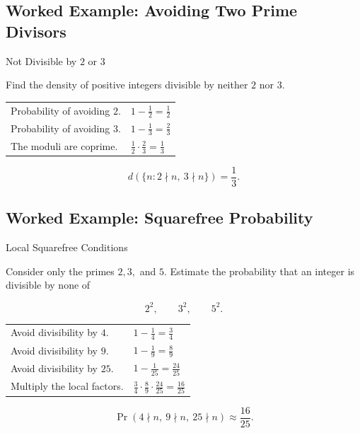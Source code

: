 \subsection{Worked Example: Avoiding Two Prime Divisors}
\label{subsec:worked-avoiding-primes}

\begin{workedexamplebox}{Not Divisible by \(2\) or \(3\)}

Find the density of positive integers divisible by neither \(2\) nor \(3\).

\begin{tabularx}{\textwidth}{@{}>{\raggedright\arraybackslash}p{}X@{}}
Probability of avoiding \(2\). & \(1-\frac12=\frac12\)\\
Probability of avoiding \(3\). & \(1-\frac13=\frac23\)\\
The moduli are coprime. & \(\frac12\cdot\frac23=\frac13\)
\end{tabularx}

\begin{answerbox}
\[ \boxed{d(\{n:2\nmid n,\ 3\nmid n\})=\frac13.} \]
\end{answerbox}
\end{workedexamplebox}

\subsection{Worked Example: Squarefree Probability}
\label{subsec:worked-squarefree-probability}

\begin{workedexamplebox}{Local Squarefree Conditions}

Consider only the primes \(2,3,\) and \(5\). Estimate the probability that an
integer is divisible by none of

\[ 2^2,\qquad3^2,\qquad5^2. \]

\begin{tabularx}{\textwidth}{@{}>{\raggedright\arraybackslash}p{}X@{}}
Avoid divisibility by \(4\). & \(1-\frac14=\frac34\)\\
Avoid divisibility by \(9\). & \(1-\frac19=\frac89\)\\
Avoid divisibility by \(25\). & \(1-\frac1{25}=\frac{24}{25}\)\\
Multiply the local factors. &
\(\frac34\cdot\frac89\cdot\frac{24}{25}=\frac{16}{25}\)
\end{tabularx}

\begin{answerbox}
\[ \boxed{\Pr(4\nmid n,\ 9\nmid n,\ 25\nmid n)\approx\frac{16}{25}.} \]
\end{answerbox}
\end{workedexamplebox}

